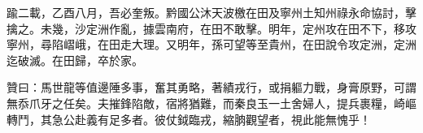 \begin{pinyinscope}
踰二載，乙酉八月，吾必奎叛。黔國公沐天波檄在田及寧州土知州祿永命協討，擊擒之。未幾，沙定洲作亂，據雲南府，在田不敢擊。明年，定州攻在田不下，移攻寧州，尋陷嶍峨，在田走大理。又明年，孫可望等至貴州，在田說令攻定洲，定洲迄破滅。在田歸，卒於家。

贊曰：馬世龍等值邊陲多事，奮其勇略，著績戎行，或捐軀力戰，身膏原野，可謂無忝爪牙之任矣。夫摧鋒陷敵，宿將猶難，而秦良玉一土舍婦人，提兵裹糧，崎嶇轉鬥，其急公赴義有足多者。彼仗鉞臨戎，縮朒觀望者，視此能無愧乎！


\end{pinyinscope}